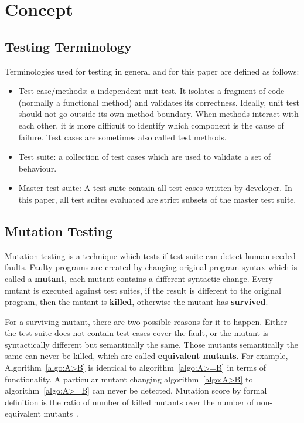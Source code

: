 \section{Concept}
\subsection{Testing Terminology}
Terminologies used for testing in general and for this paper are defined as follows:
\begin{itemize}
	\item Test case/methods: a independent unit test. It isolates a fragment of code (normally a functional method) and validates its correctness. Ideally, unit test should not go outside its own method boundary. When methods interact with each other, it is more difficult to identify which component is the cause of failure. Test cases are sometimes also called test methods.
	\item Test suite: a collection of test cases which are used to validate a set of behaviour.
	\item Master test suite: A test suite contain all test cases written by developer. In this paper, all test suites evaluated are strict subsets of the master test suite.
\end{itemize}
\subsection{Mutation Testing}
Mutation testing is a technique which tests if test suite can detect human seeded faults. Faulty programs are created by changing original program syntax which is called a \textbf{mutant}, each mutant contains a different syntactic change. Every mutant is executed against test suites, if the result is different to the original program, then the mutant is \textbf{killed}, otherwise the mutant has \textbf{survived}.

For a surviving mutant, there are two possible reasons for it to happen. Either the test suite does not contain test cases cover the fault, or the mutant is syntactically different but semantically the same. Those mutants semantically the same can never be killed, which are called \textbf{equivalent mutants}. For example, Algorithm~\ref{algo:A>B} is identical to algorithm~\ref{algo:A>=B} in terms of functionality. A particular mutant changing algorithm~\ref{algo:A>B} to algorithm~\ref{algo:A>=B} can never be detected. Mutation score by formal definition is the ratio of number of killed mutants over the number of non-equivalent mutants~\cite{jia2011analysis}. 

